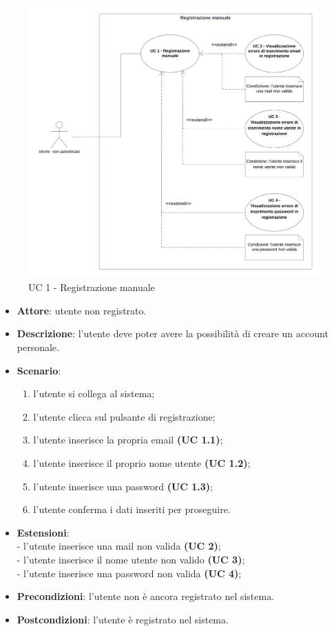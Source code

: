 \begin{figure}[!h]
    \includegraphics[width=15cm]{sezioni/Images/UC1.png}
    \centering
    \caption{UC 1 - Registrazione manuale}
\end{figure}

\begin{itemize}
    \item \textbf{Attore}: utente non registrato.
    \item \textbf{Descrizione}: l’utente deve poter avere la possibilità di creare un account personale.
    \item \textbf{Scenario}:
    \begin{enumerate}
        \item l’utente si collega al sistema;
        \item l’utente clicca sul pulsante di registrazione;
        \item l’utente inserisce la propria email \textbf{(UC 1.1)};
        \item l’utente inserisce il proprio nome utente \textbf{(UC 1.2)};
        \item l’utente inserisce una password \textbf{(UC 1.3)};
        \item l’utente conferma i dati inseriti per proseguire.
    \end{enumerate}
    \item \textbf{Estensioni}:\\
        - l’utente inserisce una mail non valida  \textbf{(UC 2)};\\
        - l’utente inserisce il nome utente non valido \textbf{(UC 3)};\\
        - l’utente inserisce una password non valida \textbf{(UC 4)};\\

    \item \textbf{Precondizioni}: l’utente non è ancora registrato nel sistema.
    \item \textbf{Postcondizioni}: l’utente è registrato nel sistema.
\end{itemize}

